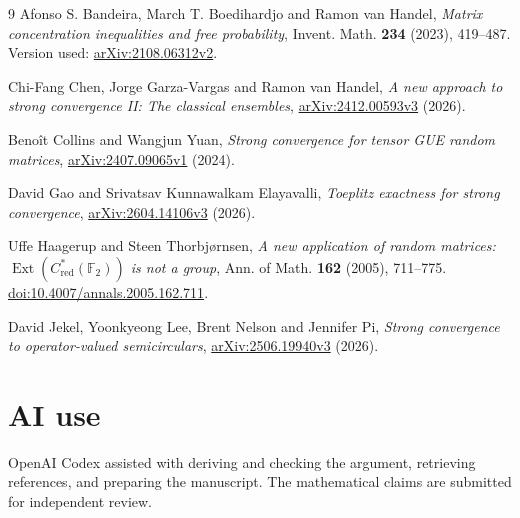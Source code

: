 \documentclass[11pt]{article}
\begin{document}
\begin{thebibliography}{9}
Afonso S. Bandeira, March T. Boedihardjo and Ramon van Handel,
\emph{Matrix concentration inequalities and free probability},
Invent. Math. \textbf{234} (2023), 419--487.
Version used: \href{https://arxiv.org/abs/2108.06312v2}{arXiv:2108.06312v2}.

Chi-Fang Chen, Jorge Garza-Vargas and Ramon van Handel,
\emph{A new approach to strong convergence II: The classical ensembles},
\href{https://arxiv.org/abs/2412.00593v3}{arXiv:2412.00593v3} (2026).

Beno\^{i}t Collins and Wangjun Yuan,
\emph{Strong convergence for tensor GUE random matrices},
\href{https://arxiv.org/abs/2407.09065v1}{arXiv:2407.09065v1} (2024).

David Gao and Srivatsav Kunnawalkam Elayavalli,
\emph{Toeplitz exactness for strong convergence},
\href{https://arxiv.org/abs/2604.14106v3}{arXiv:2604.14106v3} (2026).

Uffe Haagerup and Steen Thorbj{\o}rnsen,
\emph{A new application of random matrices:
$\operatorname{Ext}(C^*_{\mathrm{red}}(\mathbb F_2))$ is not a group},
Ann. of Math. \textbf{162} (2005), 711--775.
\href{https://doi.org/10.4007/annals.2005.162.711}{doi:10.4007/annals.2005.162.711}.

David Jekel, Yoonkyeong Lee, Brent Nelson and Jennifer Pi,
\emph{Strong convergence to operator-valued semicirculars},
\href{https://arxiv.org/abs/2506.19940v3}{arXiv:2506.19940v3} (2026).
\end{thebibliography}

\section*{AI use}
OpenAI Codex assisted with deriving and checking the argument,
retrieving references, and preparing the manuscript.
The mathematical claims are submitted for independent review.
\end{document}
